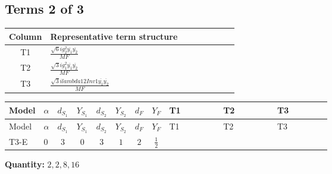 \documentclass[8pt]{article}
\begin{document}
\begin{landscape}
\subsection*{Terms 2 of 3}
\begin{center}
\begin{tabular}{@{}c >{\raggedright\arraybackslash}p{0.82\linewidth}@{}}
\toprule
Column & Representative term structure \\
\midrule
T1 & \(\displaystyle \frac{\sqrt{6} i g_{2}^{2} \overline{y_{1}} \overline{y_{2}}}{MF}\) \\
\midrule
T2 & \(\displaystyle \frac{\sqrt{3} i g_{1}^{2} \overline{y_{1}} \overline{y_{2}}}{MF}\) \\
\midrule
T3 & \(\displaystyle \frac{\sqrt{3} i lambda12Inv1 \overline{y_{1}} \overline{y_{2}}}{MF}\) \\
\midrule
\bottomrule
\end{tabular}
\end{center}
\smallskip
\tiny
\begin{longtable}{@{}llcccccc >{\raggedright\arraybackslash}p{0.21\linewidth} >{\raggedright\arraybackslash}p{0.21\linewidth} >{\raggedright\arraybackslash}p{0.21\linewidth}@{}}
\toprule
Model & $\alpha$ & $d_{S_1}$ & $Y_{S_1}$ & $d_{S_2}$ & $Y_{S_2}$ & $d_F$ & $Y_F$ & T1 & T2 & T3 \\
\midrule
\endfirsthead
\toprule
Model & $\alpha$ & $d_{S_1}$ & $Y_{S_1}$ & $d_{S_2}$ & $Y_{S_2}$ & $d_F$ & $Y_F$ & T1 & T2 & T3 \\
\midrule
\endhead
T3-E & $0$ & $3$ & $0$ & $3$ & $1$ & $2$ & $\frac{1}{2}$ & \scriptsize\adjustbox{max width=\linewidth}{$\begin{gathered} - \frac{\sqrt{6} i g_{2}^{2} \overline{y_{1}} \overline{y_{2}}}{3 MF}\end{gathered}$} & \scriptsize\adjustbox{max width=\linewidth}{$\begin{gathered} - \frac{\sqrt{3} i g_{1}^{2} \overline{y_{1}} \overline{y_{2}}}{8 MF}\end{gathered}$} & \scriptsize\adjustbox{max width=\linewidth}{$\begin{gathered} \frac{\sqrt{3} i lambda12Inv1 \overline{y_{1}} \overline{y_{2}}}{6 MF}\end{gathered}$} \\
\midrule
\bottomrule
\end{longtable}
\clearpage
\noindent\textbf{Quantity: }$\mathrm{2,2,8,16}$\par\smallskip

\end{landscape}
\end{document}
